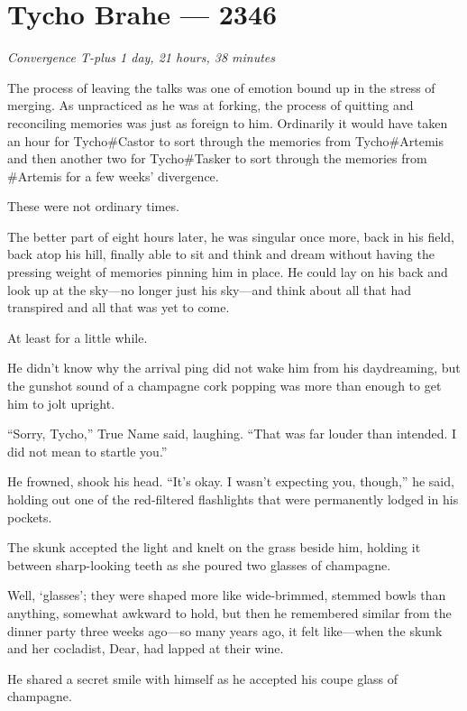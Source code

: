 \hypertarget{tycho-brahe-2346}{%
\chapter{Tycho Brahe — 2346}}

\begin{center}
\emph{Convergence T-plus 1 day, 21 hours, 38 minutes}
\end{center}

\noindent The process of leaving the talks was one of emotion bound up in the stress of merging. As unpracticed as he was at forking, the process of quitting and reconciling memories was just as foreign to him. Ordinarily it would have taken an hour for Tycho\#Castor to sort through the memories from Tycho\#Artemis and then another two for Tycho\#Tasker to sort through the memories from \#Artemis for a few weeks' divergence.

These were not ordinary times.

The better part of eight hours later, he was singular once more, back in his field, back atop his hill, finally able to sit and think and dream without having the pressing weight of memories pinning him in place. He could lay on his back and look up at the sky—no longer just his sky—and think about all that had transpired and all that was yet to come.

At least for a little while.

He didn't know why the arrival ping did not wake him from his daydreaming, but the gunshot sound of a champagne cork popping was more than enough to get him to jolt upright.

``Sorry, Tycho,'' True Name said, laughing. ``That was far louder than intended. I did not mean to startle you.''

He frowned, shook his head. ``It's okay. I wasn't expecting you, though,'' he said, holding out one of the red-filtered flashlights that were permanently lodged in his pockets.

The skunk accepted the light and knelt on the grass beside him, holding it between sharp-looking teeth as she poured two glasses of champagne.

Well, `glasses'; they were shaped more like wide-brimmed, stemmed bowls than anything, somewhat awkward to hold, but then he remembered similar from the dinner party three weeks ago—so many years ago, it felt like—when the skunk and her cocladist, Dear, had lapped at their wine.

He shared a secret smile with himself as he accepted his coupe glass of champagne.

